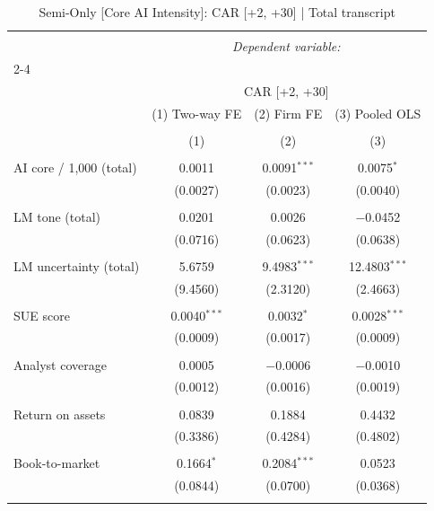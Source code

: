 
\begin{table}[!htbp] \centering 
  \caption{Semi-Only [Core AI Intensity]: CAR [+2, +30]  |  Total transcript} 
  \label{} 
\begin{tabular}{@{\extracolsep{5pt}}lccc} 
\\[-1.8ex]\hline 
\hline \\[-1.8ex] 
 & \multicolumn{3}{c}{\textit{Dependent variable:}} \\ 
\cline{2-4} 
\\[-1.8ex] & \multicolumn{3}{c}{CAR [+2, +30]} \\ 
 & (1) Two-way FE & (2) Firm FE & (3) Pooled OLS \\ 
\\[-1.8ex] & (1) & (2) & (3)\\ 
\hline \\[-1.8ex] 
 AI core / 1,000 (total) & 0.0011 & 0.0091$^{***}$ & 0.0075$^{*}$ \\ 
  & (0.0027) & (0.0023) & (0.0040) \\ 
  & & & \\ 
 LM tone (total) & 0.0201 & 0.0026 & $-$0.0452 \\ 
  & (0.0716) & (0.0623) & (0.0638) \\ 
  & & & \\ 
 LM uncertainty (total) & 5.6759 & 9.4983$^{***}$ & 12.4803$^{***}$ \\ 
  & (9.4560) & (2.3120) & (2.4663) \\ 
  & & & \\ 
 SUE score & 0.0040$^{***}$ & 0.0032$^{*}$ & 0.0028$^{***}$ \\ 
  & (0.0009) & (0.0017) & (0.0009) \\ 
  & & & \\ 
 Analyst coverage & 0.0005 & $-$0.0006 & $-$0.0010 \\ 
  & (0.0012) & (0.0016) & (0.0019) \\ 
  & & & \\ 
 Return on assets & 0.0839 & 0.1884 & 0.4432 \\ 
  & (0.3386) & (0.4284) & (0.4802) \\ 
  & & & \\ 
 Book-to-market & 0.1664$^{*}$ & 0.2084$^{***}$ & 0.0523 \\ 
  & (0.0844) & (0.0700) & (0.0368) \\ 
  & & & \\ 

\end{tabular}
\end{table}
